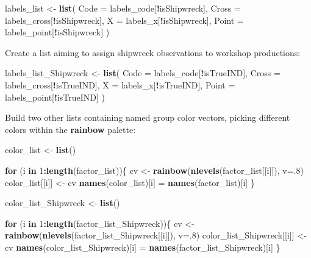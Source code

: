 \documentclass[12pt,]{book}
\newenvironment{Shaded}{\begin{snugshade}}{\end{snugshade}}
\newcommand{\ControlFlowTok}[1]{\textcolor[rgb]{0.13,0.29,0.53}{\textbf{#1}}}
\newcommand{\DataTypeTok}[1]{\textcolor[rgb]{0.13,0.29,0.53}{#1}}
\newcommand{\DecValTok}[1]{\textcolor[rgb]{0.00,0.00,0.81}{#1}}
\newcommand{\KeywordTok}[1]{\textcolor[rgb]{0.13,0.29,0.53}{\textbf{#1}}}
\newcommand{\NormalTok}[1]{#1}
\newcommand{\OperatorTok}[1]{\textcolor[rgb]{0.81,0.36,0.00}{\textbf{#1}}}
\newcommand{\StringTok}[1]{\textcolor[rgb]{0.31,0.60,0.02}{#1}}
\begin{document}
\begin{Shaded}
\begin{Highlighting}[]
\NormalTok{labels_list <-}\StringTok{ }\KeywordTok{list}\NormalTok{(}
  \DataTypeTok{Code =}\NormalTok{ labels_code[}\OperatorTok{!}\NormalTok{isShipwreck],}
  \DataTypeTok{Cross =}\NormalTok{ labels_cross[}\OperatorTok{!}\NormalTok{isShipwreck],}
  \DataTypeTok{X =}\NormalTok{ labels_x[}\OperatorTok{!}\NormalTok{isShipwreck],}
  \DataTypeTok{Point =}\NormalTok{ labels_point[}\OperatorTok{!}\NormalTok{isShipwreck]}
\NormalTok{)}
\end{Highlighting}
\end{Shaded}

Create a list aiming to assign shipwreck observations to workshop productions:

\begin{Shaded}
\begin{Highlighting}[]
\NormalTok{labels_list_Shipwreck <-}\StringTok{ }\KeywordTok{list}\NormalTok{(}
  \DataTypeTok{Code =}\NormalTok{ labels_code[}\OperatorTok{!}\NormalTok{isTrueIND],}
  \DataTypeTok{Cross =}\NormalTok{ labels_cross[}\OperatorTok{!}\NormalTok{isTrueIND],}
  \DataTypeTok{X =}\NormalTok{ labels_x[}\OperatorTok{!}\NormalTok{isTrueIND],}
  \DataTypeTok{Point =}\NormalTok{ labels_point[}\OperatorTok{!}\NormalTok{isTrueIND]}
\NormalTok{)}
\end{Highlighting}
\end{Shaded}

Build two other lists containing named group color vectors, picking different colors within the \textbf{rainbow} palette:

\begin{Shaded}
\begin{Highlighting}[]
\NormalTok{color_list <-}\StringTok{ }\KeywordTok{list}\NormalTok{()}

\ControlFlowTok{for}\NormalTok{ (i }\ControlFlowTok{in} \DecValTok{1}\OperatorTok{:}\KeywordTok{length}\NormalTok{(factor_list))\{}
\NormalTok{  cv <-}\StringTok{ }\KeywordTok{rainbow}\NormalTok{(}\KeywordTok{nlevels}\NormalTok{(factor_list[[i]]), }\DataTypeTok{v=}\NormalTok{.}\DecValTok{8}\NormalTok{)}
\NormalTok{  color_list[[i]] <-}\StringTok{ }\NormalTok{cv}
  \KeywordTok{names}\NormalTok{(color_list)[i] =}\StringTok{ }\KeywordTok{names}\NormalTok{(factor_list)[i]}
\NormalTok{\}}

\NormalTok{color_list_Shipwreck <-}\StringTok{ }\KeywordTok{list}\NormalTok{()}

\ControlFlowTok{for}\NormalTok{ (i }\ControlFlowTok{in} \DecValTok{1}\OperatorTok{:}\KeywordTok{length}\NormalTok{(factor_list_Shipwreck))\{}
\NormalTok{  cv <-}\StringTok{ }\KeywordTok{rainbow}\NormalTok{(}\KeywordTok{nlevels}\NormalTok{(factor_list_Shipwreck[[i]]), }\DataTypeTok{v=}\NormalTok{.}\DecValTok{8}\NormalTok{)}
\NormalTok{  color_list_Shipwreck[[i]] <-}\StringTok{ }\NormalTok{cv}
  \KeywordTok{names}\NormalTok{(color_list_Shipwreck)[i] =}\StringTok{ }\KeywordTok{names}\NormalTok{(factor_list_Shipwreck)[i]}
\NormalTok{\}}
\end{Highlighting}
\end{Shaded}
\end{document}
